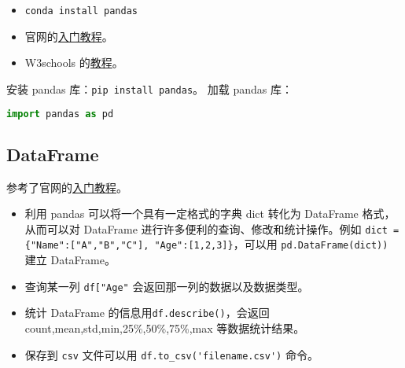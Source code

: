 
\begin{issues}
\issueDraft
\end{issues}

\begin{itemize}
\item \verb`conda install pandas`
\item 官网的\href{https://pandas.pydata.org/docs/getting_started/index.html}{入门教程}。
\item W3schools 的\href{https://www.w3schools.com/python/pandas/default.asp}{教程}。
\end{itemize}
安装 pandas 库：\verb`pip install pandas`。
加载 pandas 库：
\begin{lstlisting}[language=python]
import pandas as pd
\end{lstlisting}
\subsection{DataFrame}
参考了官网的\href{https://pandas.pydata.org/docs/getting_started/index.html}{入门教程}。
\begin{itemize}
\item 
利用 pandas 可以将一个具有一定格式的字典 dict 转化为 DataFrame 格式，从而可以对 DataFrame 进行许多便利的查询、修改和统计操作。例如 \verb`dict = {"Name":["A","B","C"], "Age":[1,2,3]}`，可以用 \verb`pd.DataFrame(dict))` 建立 DataFrame。
\item 查询某一列 \verb`df["Age"` 会返回那一列的数据以及数据类型。
\item 统计 DataFrame 的信息用\verb`df.describe()`，会返回 count,mean,std,min,25\%,50\%,75\%,max 等数据统计结果。
\item 保存到 \verb`csv` 文件可以用 \verb`df.to_csv('filename.csv')` 命令。
\end{itemize}
